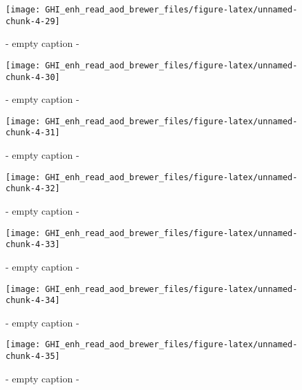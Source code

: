 \documentclass[
  10pt,
  a4paper,oneside]{article}
\begin{document}
\begin{figure}[H]

{\centering \texttt{[image: GHI\_enh\_read\_aod\_brewer\_files/figure-latex/unnamed-chunk-4-29]} 

}

\caption{ - empty caption - }\label{fig:unnamed-chunk-4-29}
\end{figure}
\begin{figure}[H]

{\centering \texttt{[image: GHI\_enh\_read\_aod\_brewer\_files/figure-latex/unnamed-chunk-4-30]} 

}

\caption{ - empty caption - }\label{fig:unnamed-chunk-4-30}
\end{figure}
\begin{figure}[H]

{\centering \texttt{[image: GHI\_enh\_read\_aod\_brewer\_files/figure-latex/unnamed-chunk-4-31]} 

}

\caption{ - empty caption - }\label{fig:unnamed-chunk-4-31}
\end{figure}
\begin{figure}[H]

{\centering \texttt{[image: GHI\_enh\_read\_aod\_brewer\_files/figure-latex/unnamed-chunk-4-32]} 

}

\caption{ - empty caption - }\label{fig:unnamed-chunk-4-32}
\end{figure}
\begin{figure}[H]

{\centering \texttt{[image: GHI\_enh\_read\_aod\_brewer\_files/figure-latex/unnamed-chunk-4-33]} 

}

\caption{ - empty caption - }\label{fig:unnamed-chunk-4-33}
\end{figure}
\begin{figure}[H]

{\centering \texttt{[image: GHI\_enh\_read\_aod\_brewer\_files/figure-latex/unnamed-chunk-4-34]} 

}

\caption{ - empty caption - }\label{fig:unnamed-chunk-4-34}
\end{figure}
\begin{figure}[H]

{\centering \texttt{[image: GHI\_enh\_read\_aod\_brewer\_files/figure-latex/unnamed-chunk-4-35]} 

}

\caption{ - empty caption - }\label{fig:unnamed-chunk-4-35}
\end{figure}
\end{document}

